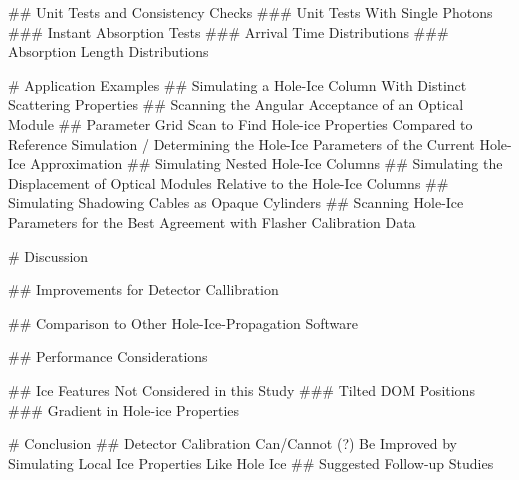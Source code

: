 
## Unit Tests and Consistency Checks
### Unit Tests With Single Photons
### Instant Absorption Tests
### Arrival Time Distributions
### Absorption Length Distributions

# Application Examples
## Simulating a Hole-Ice Column With Distinct Scattering Properties
## Scanning the Angular Acceptance of an Optical Module
## Parameter Grid Scan to Find Hole-ice Properties Compared to Reference Simulation / Determining the Hole-Ice Parameters of the Current Hole-Ice Approximation
## Simulating Nested Hole-Ice Columns
## Simulating the Displacement of Optical Modules Relative to the Hole-Ice Columns
## Simulating Shadowing Cables as Opaque Cylinders
## Scanning Hole-Ice Parameters for the Best Agreement with Flasher Calibration Data

# Discussion

## Improvements for Detector Callibration

## Comparison to Other Hole-Ice-Propagation Software

## Performance Considerations

## Ice Features Not Considered in this Study
### Tilted DOM Positions
### Gradient in Hole-ice Properties

# Conclusion
## Detector Calibration Can/Cannot (?) Be Improved by Simulating Local Ice Properties Like Hole Ice
## Suggested Follow-up Studies
